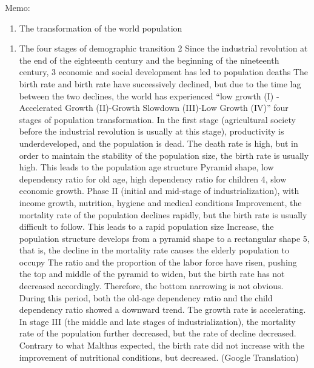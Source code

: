 \documentclass[
]{book}
\providecommand{\tightlist}{%
  \setlength{\itemsep}{0pt}\setlength{\parskip}{0pt}}
\begin{document}
Memo:

\begin{enumerate}
\def\labelenumi{\arabic{enumi}.}
\tightlist
\item
  The transformation of the world population
\end{enumerate}

\begin{enumerate}
\def\labelenumi{(\arabic{enumi})}
\tightlist
\item
  The four stages of demographic transition 2
  Since the industrial revolution at the end of the eighteenth century and the beginning of the nineteenth century, 3 economic and social development has led to population deaths
  The birth rate and birth rate have successively declined, but due to the time lag between the two declines, the world has experienced ``low growth (I)
  -Accelerated Growth (II)-Growth Slowdown (III)-Low Growth (IV)'' four stages of population transformation.
  In the first stage (agricultural society before the industrial revolution is usually at this stage), productivity is underdeveloped, and the population is dead.
  The death rate is high, but in order to maintain the stability of the population size, the birth rate is usually high. This leads to the population age structure
  Pyramid shape, low dependency ratio for old age, high dependency ratio for children 4, slow economic growth.
  Phase II (initial and mid-stage of industrialization), with income growth, nutrition, hygiene and medical conditions
  Improvement, the mortality rate of the population declines rapidly, but the birth rate is usually difficult to follow. This leads to a rapid population size
  Increase, the population structure develops from a pyramid shape to a rectangular shape 5, that is, the decline in the mortality rate causes the elderly population to occupy
  The ratio and the proportion of the labor force have risen, pushing the top and middle of the pyramid to widen, but the birth rate has not decreased accordingly.
  Therefore, the bottom narrowing is not obvious. During this period, both the old-age dependency ratio and the child dependency ratio showed a downward trend.
  The growth rate is accelerating.
  In stage III (the middle and late stages of industrialization), the mortality rate of the population further decreased, but the rate of decline decreased.
  Contrary to what Malthus expected, the birth rate did not increase with the improvement of nutritional conditions, but decreased. (Google Translation)
\end{enumerate}
\end{document}
